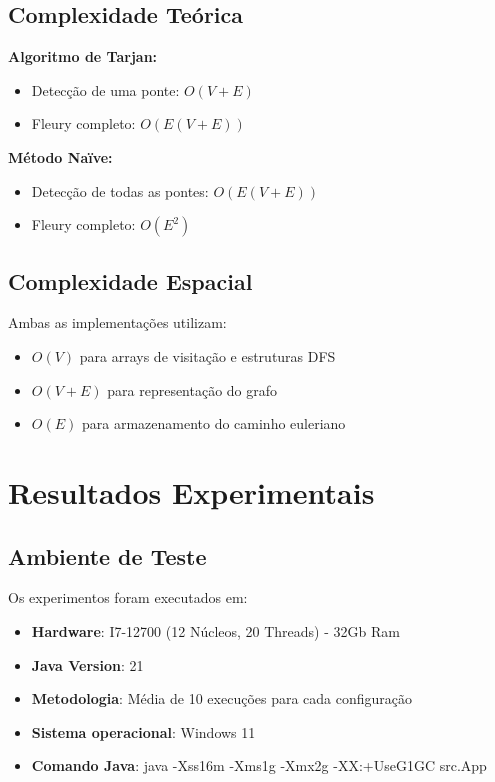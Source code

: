 \documentclass[12pt]{article}
\begin{document}
\subsection{Complexidade Teórica}

\textbf{Algoritmo de Tarjan:}
\begin{itemize}
\item Detecção de uma ponte: $O(V + E)$
\item Fleury completo: $O(E(V + E))$
\end{itemize}

\textbf{Método Naïve:}
\begin{itemize}
\item Detecção de todas as pontes: \(O(E(V + E))\)  
\item Fleury completo: \(O(E^2)\)
\end{itemize}

\subsection{Complexidade Espacial}

Ambas as implementações utilizam:

\begin{itemize}
\item $O(V)$ para arrays de visitação e estruturas DFS
\item $O(V + E)$ para representação do grafo
\item $O(E)$ para armazenamento do caminho euleriano
\end{itemize}

\section{Resultados Experimentais}

\subsection{Ambiente de Teste}

Os experimentos foram executados em:

\begin{itemize}
\item \textbf{Hardware}: I7-12700 (12 Núcleos, 20 Threads) - 32Gb Ram
\item \textbf{Java Version}: 21
\item \textbf{Metodologia}: Média de 10 execuções para cada configuração
\item \textbf{Sistema operacional}: Windows 11
\item \textbf{Comando Java}: java -Xss16m -Xms1g -Xmx2g -XX:+UseG1GC src.App

\end{itemize}
\end{document}
